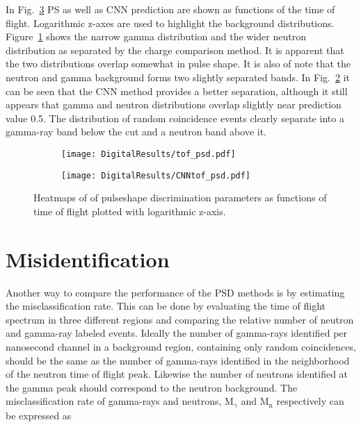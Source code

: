 \documentclass[main.tex]{subfiles}
\begin{document}
In Fig.~\ref{fig:tof_cc_tof_cnn} PS as well as CNN prediction are shown as functions of the time of flight. Logarithmic z-axes are used to highlight the background distributions. Figure~\ref{fig:tof_digi_cc} shows the narrow gamma distribution and the wider neutron distribution as separated by the charge comparison method. It is apparent that the two distributions overlap somewhat in pulse shape. It is also of note that the neutron and gamma background forms two slightly separated bands.  In Fig.~\ref{fig:tof_digi_cnn} it can be seen that the CNN method provides a better separation, although it still appears that gamma and neutron distributions overlap slightly near prediction value 0.5. The distribution of random coincidence events clearly separate into a gamma-ray band below the cut and a neutron band above it.


\begin{figure}
    \centering
    \begin{subfigure}[ht]{\textwidth}
    	\centering
        \texttt{[image: DigitalResults/tof\_psd.pdf]}
        \caption{}
        \label{fig:tof_digi_cc}
    \end{subfigure}
	\begin{subfigure}[ht]{\textwidth}
		\centering
        \texttt{[image: DigitalResults/CNNtof\_psd.pdf]}
        \caption{}
        \label{fig:tof_digi_cnn}
    \end{subfigure}
    \caption[Pulse shape parameters as function of time of flight, digital setup.]{Heatmaps of of pulseshape discrimination parameters as functions of time of flight plotted with logarithmic z-axis.}
    \label{fig:tof_cc_tof_cnn}
\end{figure}



\section{Misidentification}\label{sec:comp}


Another way to compare the performance of the PSD methods is by estimating the misclassification rate. This can be done by evaluating the time of flight spectrum in three different regions and comparing the relative number of neutron and gamma-ray labeled events. Ideally the number of gamma-rays identified per nanosecond channel in a background region, containing only random coincidences, should be the same as the number of gamma-rays identified in the neighborhood of the neutron time of flight peak. Likewise the number of neutrons identified at the gamma peak should correspond to the neutron background. The misclassification rate of gamma-rays and neutrons, 
M$_{\gamma}$ and M$_\textrm{n}$ respectively can be expressed as
\end{document}
